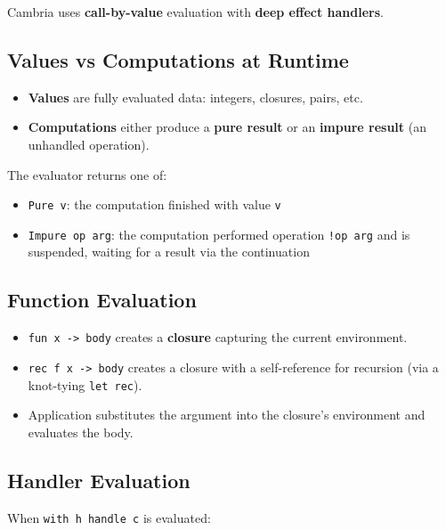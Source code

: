 \documentclass[11pt,a4paper]{article}
\newcommand{\cba}[1]{\lstinline[style=cbainline]{#1}}
\begin{document}
Cambria uses \textbf{call-by-value} evaluation with \textbf{deep effect
handlers}.

\subsection{Values vs Computations at Runtime}

\begin{itemize}
  \item \textbf{Values} are fully evaluated data: integers, closures, pairs,
        etc.
  \item \textbf{Computations} either produce a \textbf{pure result} or an
        \textbf{impure result} (an unhandled operation).
\end{itemize}

The evaluator returns one of:

\begin{itemize}
  \item \texttt{Pure v}: the computation finished with value \texttt{v}
  \item \texttt{Impure op arg}: the computation performed
        operation \texttt{!op arg} and is suspended, waiting for a result via
        the continuation
\end{itemize}

\subsection{Function Evaluation}

\begin{itemize}
  \item \cba{fun x -> body} creates a \textbf{closure} capturing the current
        environment.
  \item \cba{rec f x -> body} creates a closure with a self-reference for
        recursion (via a knot-tying \texttt{let rec}).
  \item Application substitutes the argument into the closure's environment and
        evaluates the body.
\end{itemize}

\subsection{Handler Evaluation}

When \cba{with h handle c} is evaluated:
\end{document}
